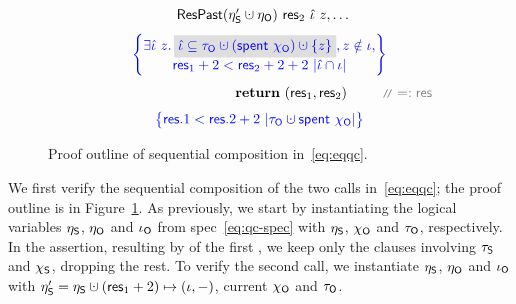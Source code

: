 \begin{figure}
\[{{\begin{array}{c}
{\begin{array}{c}
  \happrox (\gists' \hunion \gisto)~\res_2~\iknh~z, \ldots
\end{array}
\!\!\!}
\\\\[-5pt]
\spec{\!\!\!
\begin{array}{c}
  \exists \iknh~z \ldot     
  \gbm{\iknh \subseteq \tkno \hunion (\Tomb~\histo) \hunion \set{z}},
  z \notin \ikn,\\[2pt] 
  \res_1 + 2 < \res_2 + 2 + 2~|\iknh \cap \ikn|
\end{array}
\!\!\!}
\\\\[-5pt]  
~~~~~~~~~~~~~~~~~~~~~~~~~~~~~~~~
\kw{return}~(\res_1, \res_2) ~\comm{=: \res}
\\\\[-5pt]
\spec{\!\!\!
\begin{array}{c}
  \res.1 < \res.2 + 2 \ |\tkno \hunion \Tomb~\histo| 
  \end{array}
  \!\!\!} %
\end{array}
}} 
\]
%
%
\caption{Proof outline of sequential composition in~\eqref{eq:eqqc}.}
\label{fig:proof2}
\end{figure}

We first verify the sequential composition of the two calls
in~\eqref{eq:eqqc}; the proof outline is in
Figure~\ref{fig:proof2}. 
%
%
As previously, we start by instantiating the logical variables
$\eta_{\mathsf{S}}$, $\eta_{\mathsf{O}}$ and $\iota_{\mathsf{O}}$ from spec~\eqref{eq:qc-spec} with
$\eta_{\mathsf{S}}$, $\chi_{\mathsf{O}}$ and $\tau_{\mathsf{O}}$, respectively. In the assertion,
resulting by of the first , we keep only the clauses
involving $\tau_{\mathsf{S}}$ and $\chi_{\mathsf{S}}$, dropping the rest.
%
To verify the second  call, we instantiate $\eta_{\mathsf{S}}$,
$\eta_{\mathsf{O}}$ and $\iota_{\mathsf{O}}$ with $\gists' = \gists \hunion (\res_1+2) \mapsto
(\ikn, -)$, current $\chi_{\mathsf{O}}$ and $\tau_{\mathsf{O}}$.

